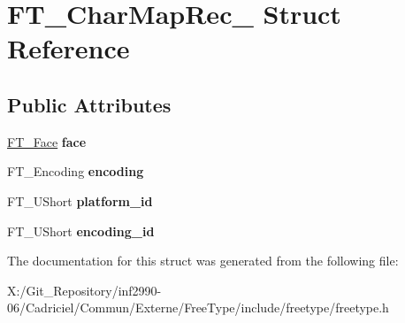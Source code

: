 \hypertarget{struct_f_t___char_map_rec__}{\section{F\-T\-\_\-\-Char\-Map\-Rec\-\_\- Struct Reference}
\label{struct_f_t___char_map_rec__}
}
\subsection*{Public Attributes}
\begin{DoxyCompactItemize}
\item 
\hypertarget{struct_f_t___char_map_rec___a70a4e53e3f9818209916e5745c46dc28}{\hyperlink{struct_f_t___face_rec__}{F\-T\-\_\-\-Face} {\bfseries face}}\label{struct_f_t___char_map_rec___a70a4e53e3f9818209916e5745c46dc28}

\item 
\hypertarget{struct_f_t___char_map_rec___a88ee6f726ef11a8e6cc793d59ff5557e}{F\-T\-\_\-\-Encoding {\bfseries encoding}}\label{struct_f_t___char_map_rec___a88ee6f726ef11a8e6cc793d59ff5557e}

\item 
\hypertarget{struct_f_t___char_map_rec___ae7f439996a8615698e780ce3c4f92457}{F\-T\-\_\-\-U\-Short {\bfseries platform\-\_\-id}}\label{struct_f_t___char_map_rec___ae7f439996a8615698e780ce3c4f92457}

\item 
\hypertarget{struct_f_t___char_map_rec___af10dd43eee8dc93e7d6191c663ae831a}{F\-T\-\_\-\-U\-Short {\bfseries encoding\-\_\-id}}\label{struct_f_t___char_map_rec___af10dd43eee8dc93e7d6191c663ae831a}

\end{DoxyCompactItemize}


The documentation for this struct was generated from the following file\-:\begin{DoxyCompactItemize}
\item 
X\-:/\-Git\-\_\-\-Repository/inf2990-\/06/\-Cadriciel/\-Commun/\-Externe/\-Free\-Type/include/freetype/freetype.\-h\end{DoxyCompactItemize}
